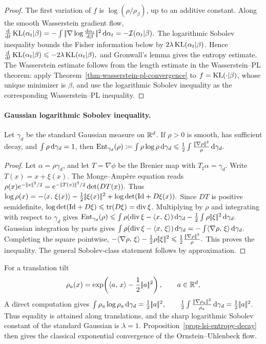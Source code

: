 \begin{proof}
The first variation of \(f\) is \(\log(\rho/\rho_\beta)\), up to an additive constant. Along the smooth Wasserstein gradient flow,
\(\frac{\mathrm{d}}{\mathrm{d} t}\operatorname{KL}(\alpha_t|\beta) = -\int |\!| \nabla\log\frac{\mathrm{d}\alpha_t}{\mathrm{d}\beta} |\!|^2\,\mathrm{d}\alpha_t = -\mathcal I(\alpha_t|\beta).\)
The logarithmic Sobolev inequality bounds the Fisher information below by \(2\lambda\operatorname{KL}(\alpha_t|\beta)\). Hence
\(\frac{\mathrm{d}}{\mathrm{d} t}\operatorname{KL}(\alpha_t|\beta) \leqslant -2\lambda\operatorname{KL}(\alpha_t|\beta),\)
and Gronwall's lemma gives the entropy estimate. The Wasserstein estimate follows from the length estimate in the Wasserstein--PL theorem: apply Theorem~\ref{thm-wasserstein-pl-convergence} to \(f=\operatorname{KL}(\cdot|\beta)\), whose unique minimizer is \(\beta\), and use the logarithmic Sobolev inequality as the corresponding Wasserstein--PL inequality.
\end{proof}
\paragraph{Gaussian logarithmic Sobolev inequality.}
\begin{prop}\label{prop-gaussian-log-sobolev-ot}
Let \(\gamma_d\) be the standard Gaussian measure on \(\mathbb{R}^d\). If \(\rho>0\) is smooth, has sufficient decay, and \(\int \rho\,\mathrm{d}\gamma_d=1\), then
\(\mathrm{Ent}_{\gamma_d}(\rho) \coloneqq \int \rho\log \rho\,\mathrm{d}\gamma_d \leqslant \frac12\int \frac{|\!| \nabla \rho |\!|^2}{\rho}\,\mathrm{d}\gamma_d.\)
\end{prop}
\begin{proof}
Let \(\alpha=\rho\gamma_d\), and let \(T=\nabla\phi\) be the Brenier map with \(T_\sharp\alpha=\gamma_d\). Write \(T(x)=x+\xi(x)\). The Monge--Amp\`ere equation reads \(\rho(x)e^{-|\!| x |\!|^2/2} = e^{-|\!| T(x) |\!|^2/2}\det(DT(x)).\)
Thus
\(\log \rho(x) = -\langle x,\,\xi(x)\rangle -\frac12|\!| \xi(x) |\!|^2 + \log\det(\mathrm{Id}+D\xi(x)).\)
Since \(DT\) is positive semidefinite, \(\log\det(\mathrm{Id}+D\xi)\leqslant\operatorname{tr}(D\xi)=\operatorname{div}\xi\). Multiplying by \(\rho\) and integrating with respect to \(\gamma_d\) gives
\(\mathrm{Ent}_{\gamma_d}(\rho) \leqslant \int \rho(\operatorname{div}\xi-\langle x,\,\xi\rangle)\,\mathrm{d}\gamma_d -\frac12\int \rho|\!| \xi |\!|^2\,\mathrm{d}\gamma_d.\)
Gaussian integration by parts gives \(\int \rho(\operatorname{div}\xi-\langle x,\,\xi\rangle)\,\mathrm{d}\gamma_d = -\int\langle \nabla \rho,\,\xi\rangle\,\mathrm{d}\gamma_d.\)
Completing the square pointwise, \(-\langle \nabla \rho,\,\xi\rangle-\frac12 \rho|\!| \xi |\!|^2 \leqslant \frac12\frac{|\!| \nabla \rho |\!|^2}{\rho}.\)
This proves the inequality. The general Sobolev-class statement follows by approximation.
\end{proof}
For a translation tilt
\[
\rho_a(x)=\exp\!\left(\langle a,\,x\rangle-\frac12|\!| a |\!|^2\right),
\qquad a\in\mathbb{R}^d,
\]
A direct computation gives \(\int \rho_a\log \rho_a\,\mathrm{d}\gamma_d = \frac12|\!| a |\!|^2, \qquad \frac12\int\frac{|\!| \nabla \rho_a |\!|^2}{\rho_a}\,\mathrm{d}\gamma_d = \frac12|\!| a |\!|^2.\)
Thus equality is attained along translations, and the sharp logarithmic Sobolev constant of the standard Gaussian is \(\lambda=1\). Proposition~\ref{prop-lsi-entropy-decay} then gives the classical exponential convergence of the Ornstein--Uhlenbeck flow.


